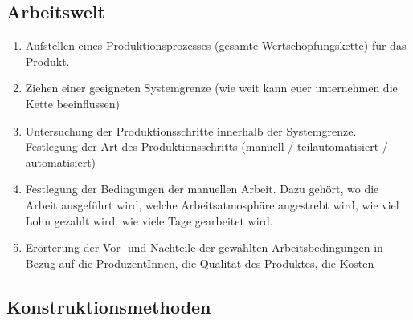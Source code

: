 \documentclass[headinclude=true]{scrartcl}
\begin{document}
\subsection{Arbeitswelt}
\label{Arbeitswelt}

\begin{enumerate}
	\item
	      Aufstellen eines Produktionsprozesses (gesamte Wertschöpfungskette)
	      für das Produkt.
	\item
	      Ziehen einer geeigneten Systemgrenze (wie weit kann euer 
	      unternehmen die Kette beeinflussen)
	\item
	      Untersuchung der Produktionsschritte innerhalb der Systemgrenze.
	      Festlegung der Art des Produktionsschritts (manuell /
	      teilautomatisiert / automatisiert)
	\item
	      Festlegung der Bedingungen der manuellen Arbeit. Dazu gehört, wo die
	      Arbeit ausgeführt wird, welche Arbeitsatmosphäre angestrebt wird, wie
	      viel Lohn gezahlt wird, wie viele Tage gearbeitet wird.
	\item
	      Erörterung der Vor- und Nachteile der gewählten Arbeitsbedingungen in
	      Bezug auf die ProduzentInnen, die Qualität des Produktes, die Kosten
\end{enumerate}

\subsection{Konstruktionsmethoden}
\end{document}
